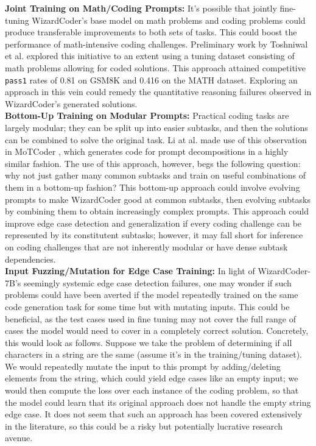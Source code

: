 \documentclass[10pt]{article}
\newcommand{\code}[1]{\texttt{#1}}
\theoremstyle{definition}
\begin{document}
\noindent \textbf{Joint Training on Math/Coding Prompts:} It's possible that jointly fine-tuning WizardCoder's base model on math problems and coding problems could produce transferable improvements to both sets of tasks. This could boost the performance of math-intensive coding challenges. Preliminary work by Toshniwal et al. \cite{openmath} explored this initiative to an extent using a tuning dataset consisting of math problems allowing for coded solutions. This approach attained competitive \code{pass1} rates of 0.81 on GSM8K and 0.416 on the MATH dataset. Exploring an approach in this vein could remedy the quantitative reasoning failures observed in WizardCoder's generated solutions.\\

\noindent\textbf{Bottom-Up Training on Modular Prompts:} Practical coding tasks are largely modular; they can be split up into easier subtasks, and then the solutions can be combined to solve the original task. Li at al. made use of this observation in MoTCoder \cite{motcoder}, which generates code for prompt decompositions in a highly similar fashion. The use of this approach, however, begs the following question: why not just gather many common subtasks and train on useful combinations of them in a bottom-up fashion? This bottom-up approach could involve evolving prompts to make WizardCoder good at common subtasks, then evolving subtasks by combining them to obtain increasingly complex prompts. This approach could improve edge case detection and generalization if every coding challenge can be represented by its constitutent subtasks; however, it may fall short for inference on coding challenges that are not inherently modular or have dense subtask dependencies.\\

\noindent \textbf{Input Fuzzing/Mutation for Edge Case Training:} In light of WizardCoder-7B's seemingly systemic edge case detection failures, one may wonder if such problems could have been averted if the model repeatedly trained on the same code generation task for some time but with mutating inputs. This could be beneficial, as the test cases used in fine tuning may not cover the full range of cases the model would need to cover in a completely correct solution. Concretely, this would look as follows. Suppose we take the problem of determining if all characters in a string are the same (assume it's in the training/tuning dataset). We would repeatedly mutate the input to this prompt by adding/deleting elements from the string, which could yield edge cases like an empty input; we would then compute the loss over each instance of the coding problem, so that the model could learn that its original approach does not handle the empty string edge case. It does not seem that such an approach has been covered extensively in the literature, so this could be a risky but potentially lucrative research avenue.\\
\end{document}
